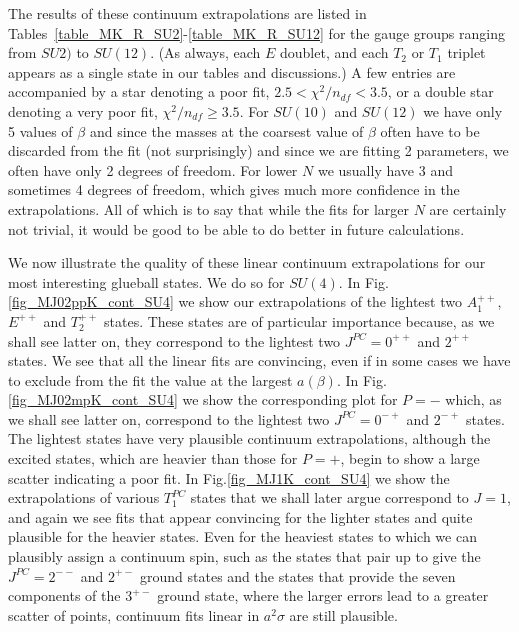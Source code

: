 \documentclass[12pt]{article}
\begin{document}
The results of these continuum extrapolations are listed in
Tables~\ref{table_MK_R_SU2}-\ref{table_MK_R_SU12} for the gauge groups ranging
from $SU2)$ to $SU(12)$. (As always, each $E$ doublet, and each $T_2$ or $T_1$
triplet appears as a single state in our tables and discussions.)
A few entries are accompanied by a star denoting a
poor fit, $2.5 < \chi^2/n_{df} < 3.5$, or a double star denoting a very poor fit,
$\chi^2/n_{df} \geq 3.5$. For $SU(10)$ and $SU(12)$ we have only 5 values of $\beta$
and since the masses at the coarsest value of $\beta$ often have to be discarded
from the fit (not surprisingly) and since we are fitting 2 parameters,
we often have only 2 degrees of freedom. For lower $N$ we usually
have 3 and sometimes 4 degrees of freedom, which gives much more confidence in
the extrapolations. All of which is to say that while the fits  for larger $N$ are
certainly not trivial, it would be good to be able to do better in future calculations.

We now illustrate the quality of these linear continuum extrapolations for our most interesting
glueball states. We do so for $SU(4)$. In Fig.\ref{fig_MJ02ppK_cont_SU4} we show our
extrapolations of the lightest two $A_1^{++}$, $E^{++}$ and  $T_2^{++}$ states.
These states are of particular importance because, as we shall see latter on, they correspond
to the lightest two $J^{PC}=0^{++}$ and $2^{++}$ states. We see that all the linear fits
are convincing, even if in some cases we have to exclude from the fit the value at the
largest $a(\beta)$. In Fig.\ref{fig_MJ02mpK_cont_SU4} we show the corresponding plot for $P=-$
which, as we shall see latter on, correspond to the lightest two $J^{PC}=0^{-+}$ and $2^{-+}$
states. The lightest states have very plausible continuum extrapolations, although
the excited states, which are heavier than those for $P=+$, begin to show a
large scatter indicating a poor fit. In Fig.\ref{fig_MJ1K_cont_SU4} we show the
extrapolations of various $T_1^{PC}$ states that we shall later argue correspond to $J=1$,
and again we see fits that appear convincing for the lighter states and quite
plausible for the heavier states. 
Even for the heaviest states to which we can plausibly assign a continuum spin, such as the
states that pair up to give the  $J^{PC}=2^{--}$ and  $2^{+-}$ ground states and the states
that provide the seven components of the $3^{+-}$ ground  state, where the
larger errors lead to a greater scatter of points, continuum fits linear in $a^2\sigma$
are still plausible.
\end{document}
